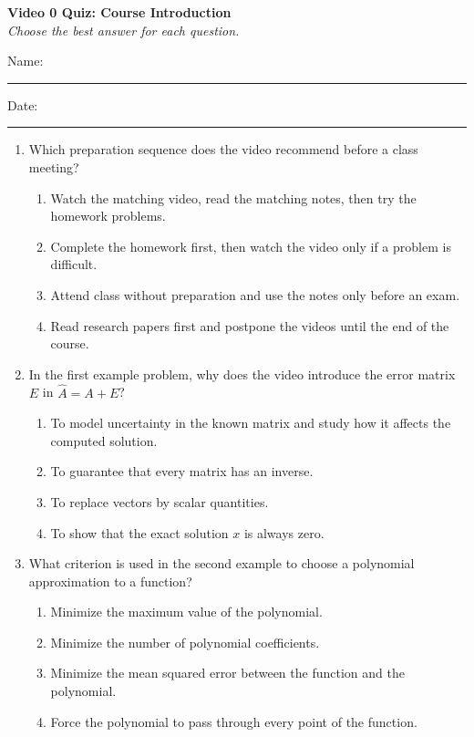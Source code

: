 \documentclass[10pt]{article}
\begin{document}
\begin{center}
  {\large\bfseries Video 0 Quiz: Course Introduction}\\[0.25em]
  \textit{Choose the best answer for each question.}
\end{center}

\noindent Name:\ \rule{3.2in}{0.4pt}\hfill Date:\ \rule{1.25in}{0.4pt}

\vspace{0.7em}

\begin{enumerate}
  \item Which preparation sequence does the video recommend before a class meeting?
  \begin{enumerate}
    \item Watch the matching video, read the matching notes, then try the homework problems.
    \item Complete the homework first, then watch the video only if a problem is difficult.
    \item Attend class without preparation and use the notes only before an exam.
    \item Read research papers first and postpone the videos until the end of the course.
  \end{enumerate}

  \item In the first example problem, why does the video introduce the error matrix $E$ in $\widehat{A}=A+E$?
  \begin{enumerate}
    \item To model uncertainty in the known matrix and study how it affects the computed solution.
    \item To guarantee that every matrix has an inverse.
    \item To replace vectors by scalar quantities.
    \item To show that the exact solution $x$ is always zero.
  \end{enumerate}

  \item What criterion is used in the second example to choose a polynomial approximation to a function?
  \begin{enumerate}
    \item Minimize the maximum value of the polynomial.
    \item Minimize the number of polynomial coefficients.
    \item Minimize the mean squared error between the function and the polynomial.
    \item Force the polynomial to pass through every point of the function.
  \end{enumerate}


\end{enumerate}
\end{document}
